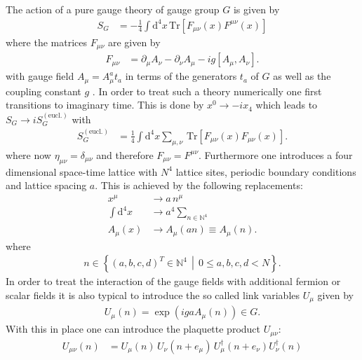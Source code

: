The action of a pure gauge theory of gauge group $G$ is given by
\begin{align*}
 S_G & = -\frac{1}{4} \int \mathrm{d}^4 x \, \mathrm{Tr} \left[ F_{\mu \nu} (x) F^{\mu \nu} (x) \right]
\end{align*}
where the matrices $F_{\mu \nu}$ are given by
\begin{align*}
 F_{\mu \nu} & =  \partial_\mu A_\nu - \partial_\nu A_\mu  -  i g [A_\mu, A_\nu] \textrm{.}
\end{align*}
with gauge field $A_\mu = A_\mu^a t_a$ in terms of the generators $t_a$ of $G$ as well as the coupling constant $g$ \cite{Peskin:1995}. In order to treat such a theory numerically one first transitions to imaginary time. This is done by $x^0 \rightarrow -i x_4$ which leads to $S_G \rightarrow i S_G^{(\textrm{eucl.})}$ with
\begin{align*}
 S_G^{(\textrm{eucl.})} & = \frac{1}{4} \int \mathrm{d}^4 x  \sum_{\mu,\nu}  \, \mathrm{Tr} \left[ F_{\mu \nu} (x) F_{\mu \nu} (x) \right] \textrm{.}
\end{align*}
where now $\eta_{\mu \nu} = \delta_{\mu \nu}$ and therefore $F_{\mu \nu} = F^{\mu \nu}$. Furthermore one introduces a four dimensional space-time lattice  with $N^4$ lattice sites, periodic boundary conditions and lattice spacing $a$. This is achieved by the following replacements:
\begin{align*}
 x^\mu               & \rightarrow a \, n^\mu                           \\
 \int \mathrm{d}^4 x & \rightarrow a^4 \sum_{n \in \mathbb{N}^4}        \\
 A_\mu (x)           & \rightarrow A_\mu(an) \equiv A_\mu(n) \textrm{.}
\end{align*}
where
\begin{align*}
 n \in \left\{ (a,b,c,d)^T \in \mathbb{N}^4 \, \middle| \, 0 \le a,b,c,d < N \right\} \textrm{.}
\end{align*}
In order to treat the interaction of the gauge fields with additional fermion or scalar fields it is also typical to introduce the so called link variables $U_\mu$ given by
\begin{align*}
 U_\mu(n) = \exp \left( i g a A_\mu(n) \right) \in G \textrm{.}
\end{align*}
With this in place one can introduce the plaquette product $U_{\mu \nu}$:
\begin{align*}
 U_{\mu \nu}(n) & = U_\mu(n) \, U_\nu(n+e_\mu) \, U^\dagger_\mu (n + e_\nu) U^\dagger_\nu(n)
\end{align*}
